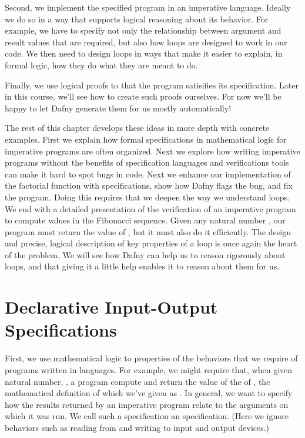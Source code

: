 \documentclass[letterpaper,10pt,english]{sphinxmanual}
\begin{document}
Second, we implement the specified program in an imperative language.
Ideally we do so in a way that supports logical reasoning about its
behavior. For example, we have to specify not only the relationship
between argument and result values that are required, but also how
loops are designed to work in our code. We then need to design loops
in ways that make it easier to explain, in formal logic, how they do
what they are meant to do.

Finally, we use logical proofs to  that the program satisifies
its specification. Later in this course, we’ll see how to create such
proofs ourselves. For now we’ll be happy to let Dafny generate them
for us mostly automatically!

The rest of this chapter develops these ideas in more depth with
concrete examples.  First we explain how formal specifications in
mathematical logic for imperative programs are often organized. Next
we explore how writing imperative programs without the benefits of
specification languages and verifications tools can make it hard to
spot bugs in code. Next we enhance our implementation of the factorial
function with specifications, show how Dafny flags the bug, and fix
the program. Doing this requires that we deepen the way we understand
loops. We end with a detailed presentation of the verification of an
imperative program to compute values in the Fibonacci sequence. Given
any natural number , our program must return the value of ,
but it must also do it efficiently.  The design and precise, logical
description of key properties of a loop is once again the heart of the
problem.  We will see how Dafny can help us to reason rigorously about
loops, and that giving it a little help enables it to reason about
them for us.


\section{Declarative Input-Output Specifications}
\label{\detokenize{05-putting-it-together:declarative-input-output-specifications}}
First, we use mathematical logic to  properties
of the behaviors that we require of programs written in 
languages. For example, we might require that, when given 
natural number, , a program compute and return the value of the
 of , the mathematical definition of which we’ve given
as .  In general, we want to specify how the results returned
by an imperative program relate to the arguments on which it was run.
We call such a specification an  specification. (Here
we ignore  behaviors such as reading from and writing
to input and output devices.)
\end{document}
